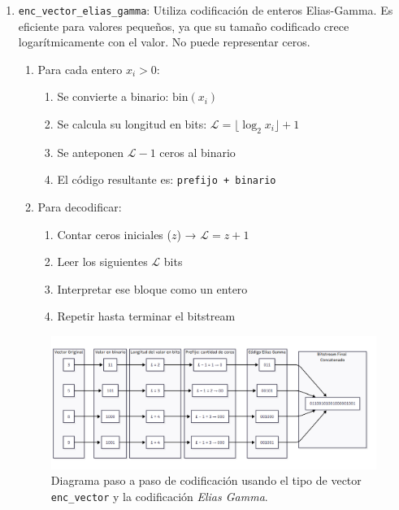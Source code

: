 \begin{enumerate}
    \item \texttt{enc\_vector\_elias\_gamma}: 
        Utiliza codificación de enteros Elias-Gamma. Es eficiente para valores pequeños, ya que su tamaño codificado crece logarítmicamente con el valor. No puede representar ceros.
        
        \begin{enumerate}
            \item Para cada entero \(x_i > 0\):
            \begin{enumerate}
                \item Se convierte a binario: \(\text{bin}(x_i)\)
                \item Se calcula su longitud en bits: \(\mathcal{L} = \lfloor \log_2 x_i \rfloor + 1\)
                \item Se anteponen \(\mathcal{L} - 1\) ceros al binario
                \item El código resultante es: \texttt{prefijo + binario}
            \end{enumerate}
            \item Para decodificar:
            \begin{enumerate}
                \item Contar ceros iniciales (\(z\)) → \(\mathcal{L} = z + 1\)
                \item Leer los siguientes \(\mathcal{L}\) bits
                \item Interpretar ese bloque como un entero
                \item Repetir hasta terminar el bitstream
            \end{enumerate}
        \end{enumerate}
    
        \begin{figure}
            \centering
            \includegraphics[width=0.9\linewidth]{alternatives/images/enc_vector_elias_gamma.png}
            \caption[Ejemplo \texttt{enc\_vector\_elias_gamma}]{Diagrama paso a paso de codificación usando el tipo de vector \texttt{enc\_vector} y la codificación \textit{Elias Gamma}.}
            \label{enc_vector_elias_gamma}
        \end{figure}
    

\end{enumerate}
